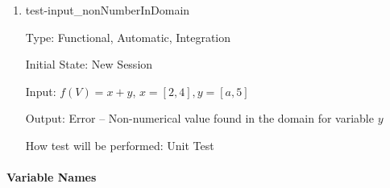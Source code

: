 \documentclass[12pt, titlepage]{article}
\begin{document}
\begin{enumerate}
	
	\item{test-input\_nonNumberInDomain}
	
	Type: Functional, Automatic, Integration
	
	Initial State: New Session
	
	Input: $f(V) = x + y$, $x = [2,4], y = [a,5]$
	
	Output: Error -- Non-numerical value found in the domain for variable $y$
	
	How test will be performed: Unit Test\\
	
\end{enumerate}

\paragraph{Variable Names}
\end{document}
